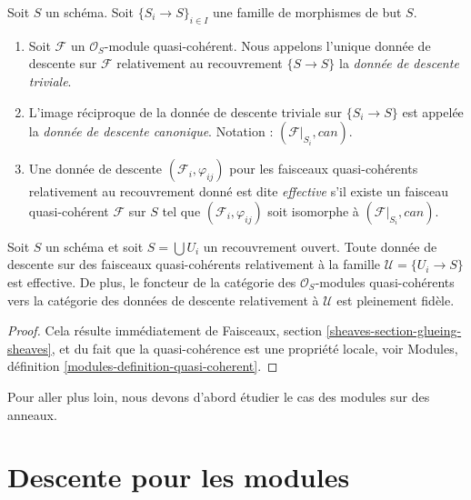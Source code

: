 \begin{definition}
\label{definition-descent-datum-effective-quasi-coherent}
Soit $S$ un schéma. Soit $\{S_i \to S\}_{i \in I}$ une famille de morphismes
de but $S$.
\begin{enumerate}
\item Soit $\mathcal{F}$ un $\mathcal{O}_S$-module quasi-cohérent. Nous
appelons l'unique donnée de descente sur $\mathcal{F}$ relativement au
recouvrement $\{S \to S\}$ la {\it donnée de descente triviale}.
\item L'image réciproque de la donnée de descente triviale sur
$\{S_i \to S\}$ est appelée la {\it donnée de descente canonique}. Notation :
$(\mathcal{F}|_{S_i}, can)$.
\item Une donnée de descente $(\mathcal{F}_i, \varphi_{ij})$ pour les
faisceaux quasi-cohérents relativement au recouvrement donné est dite
{\it effective} s'il existe un faisceau quasi-cohérent $\mathcal{F}$ sur $S$
tel que $(\mathcal{F}_i, \varphi_{ij})$ soit isomorphe à
$(\mathcal{F}|_{S_i}, can)$.
\end{enumerate}
\end{definition}

\begin{lemma}
\label{lemma-zariski-descent-effective}
Soit $S$ un schéma et soit $S = \bigcup U_i$ un recouvrement ouvert. Toute
donnée de descente sur des faisceaux quasi-cohérents relativement à la famille
$\mathcal{U} = \{U_i \to S\}$ est effective. De plus, le foncteur de la
catégorie des $\mathcal{O}_S$-modules quasi-cohérents vers la catégorie des
données de descente relativement à $\mathcal{U}$ est pleinement fidèle.
\end{lemma}

\begin{proof}
Cela résulte immédiatement de Faisceaux, section
\ref{sheaves-section-glueing-sheaves}, et du fait que la quasi-cohérence est
une propriété locale, voir Modules, définition
\ref{modules-definition-quasi-coherent}.
\end{proof}

\noindent
Pour aller plus loin, nous devons d'abord étudier le cas des modules sur des
anneaux.










\section{Descente pour les modules}
\label{section-descent-modules}

